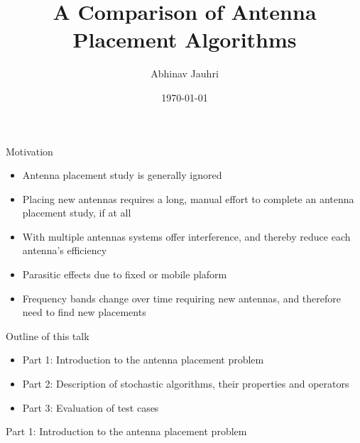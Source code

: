 \documentclass{beamer}
\title{\color{univred} A Comparison of Antenna Placement Algorithms}
\author{Abhinav Jauhri}
\date{\today}
\let\otp\titlepage
\renewcommand{\titlepage}{\otp\addtocounter{framenumber}{-1}}
\begin{document}
\begin{frame}[plain]
    \color{univred}
    \titlepage
\end{frame}

\begin{frame}{Motivation}
\begin{itemize} \itemsep1.5em
        \item Antenna placement study is generally ignored 
        \item Placing new antennas requires a long, manual effort to complete an antenna placement study, if at all
        \item With multiple antennas systems offer interference, and thereby reduce each antenna's efficiency
        \item Parasitic effects due to fixed or mobile plaform 
        \item Frequency bands change over time requiring new antennas, and therefore need to find new placements
    \end{itemize}
    \vspace{5mm}
\end{frame}

\begin{frame}{Outline of this talk}
    \begin{itemize}
        \setlength\itemsep{2em}
        \item Part 1: Introduction to the antenna placement problem
        \item Part 2: Description of stochastic algorithms, their properties and operators
        \item Part 3: Evaluation of test cases
    \end{itemize}
\end{frame}

\begin{frame}{\null}
    \begin{tcolorbox}[colback=green!5]
        \centering\Huge
        Part 1: Introduction to the antenna placement problem
    \end{tcolorbox}
\end{frame}
\end{document}
